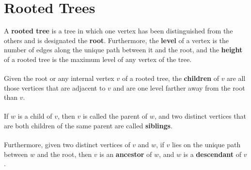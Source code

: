 \documentclass[a4paper]{article}
\begin{document}
\section{Rooted Trees}
A \textbf{rooted tree} is a tree in which one vertex has been distinguished from the others and is designated the \textbf{root}. Furthermore, the \textbf{level} of a vertex is the number of edges along the unique path between it and the root, and the \textbf{height} of a rooted tree is the maximum level of any vertex of the tree.\\\\
Given the root or any internal vertex $v$ of a rooted tree, the \textbf{children} of $v$ are all those vertices that are adjacent to $v$ and are one level farther away from the root than $v$.\\\\
If $w$ is a child of $v$, then $v$ is called the parent of $w$, and two distinct vertices that are both children of the same parent are called \textbf{siblings}. \\\\
Furthermore, given two distinct vertices of $v$ and $w$, if $v$ lies on the unique path between $w$ and the root, then $v$ is an \textbf{ancestor} of $w$, and $w$ is a \textbf{descendant} of $v$.
\end{document}

